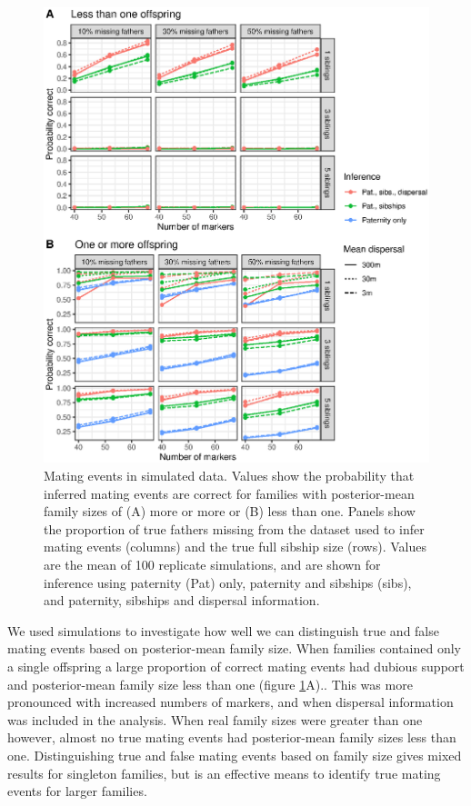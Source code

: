 \documentclass[10pt, a4paper, twocolumn]{article} %
\begin{document}
\begin{figure}
    \centering
    \includegraphics{fig-sim_mating.eps}
    \caption{
        Mating events in simulated data.
        Values show the probability that inferred mating events are correct for families with posterior-mean family sizes of (A) more or more or (B) less than one.
        Panels show the proportion of true fathers missing from the dataset used to infer mating events (columns) and the true full sibship size (rows).
        Values are the mean of 100 replicate simulations, and are shown for inference using paternity (Pat) only, paternity and sibships (sibs), and paternity, sibships and dispersal information.
    }
    \label{fig:sim-mating}
\end{figure}

We used simulations to investigate how well we can distinguish true and false mating events based on posterior-mean family size.
When families contained only a single offspring a large proportion of correct mating events had dubious support and posterior-mean family size less than one (figure \ref{fig:sim-mating}A)..
This was more pronounced with increased numbers of markers, and when dispersal information was included in the analysis.
When real family sizes were greater than one however, almost no true mating events had posterior-mean family sizes less than one.
Distinguishing true and false mating events based on family size gives mixed results for singleton families, but is an effective means to identify true mating events for larger families.
\end{document}
